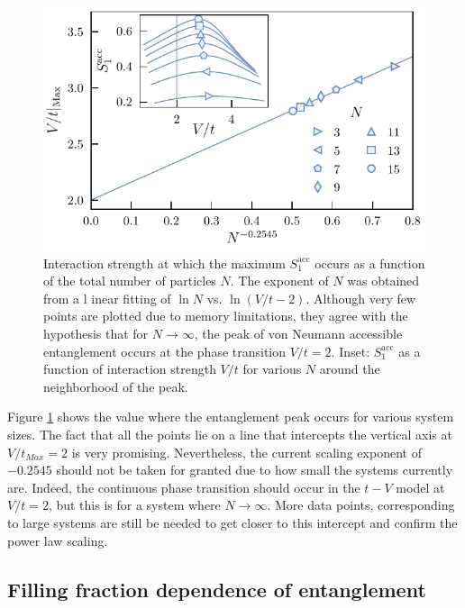 	\begin{figure}[h!]
	\begin{center}
	\includegraphics[scale=1.0]{peakScalingOddN.pdf}
	\end{center}
	\caption{Interaction strength at which the maximum $S_{1}^{\mathrm{acc}}$ occurs as a 	function of the total number of particles $N$. The exponent of $N$ was obtained from a l	inear fitting of $\ln N$ vs. $\ln{(V/t - 2)}$.  Although very few points are plotted due to 	memory limitations, they agree with the hypothesis that for $N \to \infty$, the peak of 	von Neumann accessible entanglement occurs at the phase transition $V/t = 2$. Inset: 	$S_{1}^{\mathrm{acc}}$ as a function of interaction strength $V/t$ for various $N$ 		around the neighborhood of the peak.}
	\label{fig:peakScalingOddN}
	\end{figure}
	
	Figure \ref{fig:peakScalingOddN} shows the value where the entanglement peak occurs for various system sizes. The fact that all the points lie on a line that intercepts the vertical axis at $V/t_{Max}=2$ is very promising. Nevertheless, the current scaling exponent of $-0.2545$ should not be taken for granted due to how small the systems currently are. Indeed, the continuous phase transition should occur in the $t-V$ model at $V/t=2$, but this is for a system where $N \to \infty$. More data points, corresponding to large systems are still be needed to get closer to this intercept and confirm the power law scaling.	

	
	\subsection{Filling fraction dependence of entanglement}
	
